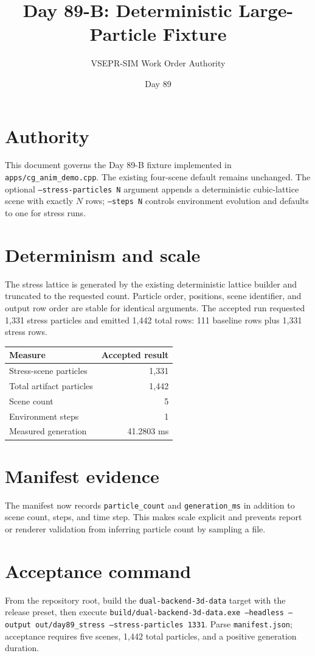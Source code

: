 \documentclass[11pt]{article}
\title{Day 89-B: Deterministic Large-Particle Fixture}
\author{VSEPR-SIM Work Order Authority}
\date{Day 89}
\begin{document}
\maketitle
\section{Authority}
This document governs the Day 89-B fixture implemented in \texttt{apps/cg\_anim\_demo.cpp}. The existing four-scene default remains unchanged. The optional \texttt{--stress-particles N} argument appends a deterministic cubic-lattice scene with exactly $N$ rows; \texttt{--steps N} controls environment evolution and defaults to one for stress runs.

\section{Determinism and scale}
The stress lattice is generated by the existing deterministic lattice builder and truncated to the requested count. Particle order, positions, scene identifier, and output row order are stable for identical arguments. The accepted run requested 1,331 stress particles and emitted 1,442 total rows: 111 baseline rows plus 1,331 stress rows.

\begin{center}
\begin{tabular}{lr}
\toprule
Measure & Accepted result \\
\midrule
Stress-scene particles & 1,331 \\
Total artifact particles & 1,442 \\
Scene count & 5 \\
Environment steps & 1 \\
Measured generation & 41.2803 ms \\
\bottomrule
\end{tabular}
\end{center}

\section{Manifest evidence}
The manifest now records \texttt{particle\_count} and \texttt{generation\_ms} in addition to scene count, steps, and time step. This makes scale explicit and prevents report or renderer validation from inferring particle count by sampling a file.

\newpage
\section{Acceptance command}
From the repository root, build the \texttt{dual-backend-3d-data} target with the release preset, then execute \texttt{build/dual-backend-3d-data.exe --headless --output out/day89\_stress --stress-particles 1331}. Parse \texttt{manifest.json}; acceptance requires five scenes, 1,442 total particles, and a positive generation duration.
\end{document}
